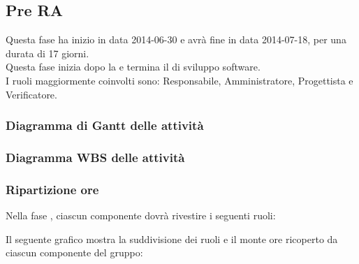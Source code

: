 \subsection{Pre RA}
Questa fase ha inizio in data 2014-06-30 e avrà fine in data 2014-07-18, per una durata di 17 giorni.\\
Questa fase inizia dopo la  e termina il  di sviluppo software.\\
I ruoli maggiormente coinvolti sono: Responsabile, Amministratore, Progettista e Verificatore.


\subsubsection{Diagramma di Gantt delle attività}

\newpage
\subsubsection{Diagramma WBS delle attività}

\newpage
\subsubsection{Ripartizione ore}

\newpage
Nella fase , ciascun componente dovrà rivestire i seguenti ruoli:

Il seguente grafico mostra la suddivisione dei ruoli e il monte ore ricoperto da ciascun componente del gruppo:
